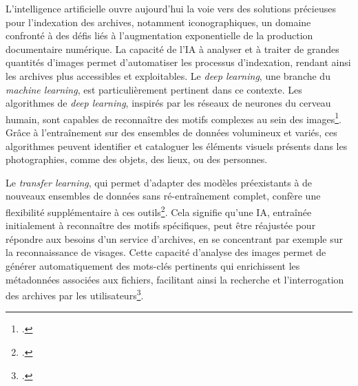 L’intelligence artificielle ouvre aujourd’hui la voie vers des solutions précieuses pour l’indexation des archives, notamment iconographiques, un domaine confronté à des défis liés à l’augmentation exponentielle de la production documentaire numérique. La capacité de l’IA à analyser et à traiter de grandes quantités d’images permet d'automatiser les processus d'indexation, rendant ainsi les archives plus accessibles et exploitables. Le \emph{deep learning}, une branche du \emph{machine learning}, est particulièrement pertinent dans ce contexte. Les algorithmes de \emph{deep learning}, inspirés par les réseaux de neurones du cerveau humain, sont capables de reconnaître des motifs complexes au sein des images\footcite[pp.3-4]{marcus2018deep}. Grâce à l'entraînement sur des ensembles de données volumineux et variés, ces algorithmes peuvent identifier et cataloguer les éléments visuels présents dans les photographies, comme des objets, des lieux, ou des personnes.

Le \emph{transfer learning}, qui permet d’adapter des modèles préexistants à de nouveaux ensembles de données sans ré-entraînement complet, confère une flexibilité supplémentaire à ces outils\footcite[pp.8-9]{marcus2018deep}. Cela signifie qu’une IA, entraînée initialement à reconnaître des motifs spécifiques, peut être réajustée pour répondre aux besoins d’un service d’archives, en se concentrant par exemple sur la reconnaissance de visages. Cette capacité d’analyse des images permet de générer automatiquement des mots-clés pertinents qui enrichissent les métadonnées associées aux fichiers, facilitant ainsi la recherche et l'interrogation des archives par les utilisateurs\footcite{langevinTechnologiesIntelligenceArtificielle2022}.

